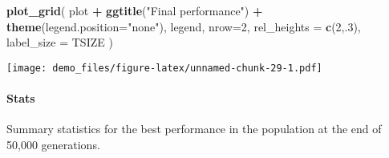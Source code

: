 \documentclass[]{book}
\newenvironment{Shaded}{\begin{snugshade}}{\end{snugshade}}
\newcommand{\DataTypeTok}[1]{\textcolor[rgb]{0.13,0.29,0.53}{#1}}
\newcommand{\DecValTok}[1]{\textcolor[rgb]{0.00,0.00,0.81}{#1}}
\newcommand{\KeywordTok}[1]{\textcolor[rgb]{0.13,0.29,0.53}{\textbf{#1}}}
\newcommand{\NormalTok}[1]{#1}
\newcommand{\OperatorTok}[1]{\textcolor[rgb]{0.81,0.36,0.00}{\textbf{#1}}}
\newcommand{\OtherTok}[1]{\textcolor[rgb]{0.56,0.35,0.01}{#1}}
\newcommand{\StringTok}[1]{\textcolor[rgb]{0.31,0.60,0.02}{#1}}
\let\oldparagraph\paragraph
\renewcommand{\paragraph}[1]{\oldparagraph{#1}\mbox{}}
\begin{document}
\begin{Shaded}
\begin{Highlighting}[]
\KeywordTok{plot_grid}\NormalTok{(}
\NormalTok{  plot }\OperatorTok{+}
\StringTok{    }\KeywordTok{ggtitle}\NormalTok{(}\StringTok{"Final performance"}\NormalTok{) }\OperatorTok{+}
\StringTok{    }\KeywordTok{theme}\NormalTok{(}\DataTypeTok{legend.position=}\StringTok{"none"}\NormalTok{),}
\NormalTok{  legend,}
  \DataTypeTok{nrow=}\DecValTok{2}\NormalTok{,}
  \DataTypeTok{rel_heights =} \KeywordTok{c}\NormalTok{(}\DecValTok{2}\NormalTok{,.}\DecValTok{3}\NormalTok{),}
  \DataTypeTok{label_size =}\NormalTok{ TSIZE}
\NormalTok{)}
\end{Highlighting}
\end{Shaded}

\texttt{[image: demo\_files/figure-latex/unnamed-chunk-29-1.pdf]}

\hypertarget{stats-23}{%
\paragraph{Stats}\label{stats-23}}

Summary statistics for the best performance in the population at the end of 50,000 generations.

\begin{Shaded}
\end{Shaded}
\end{document}
